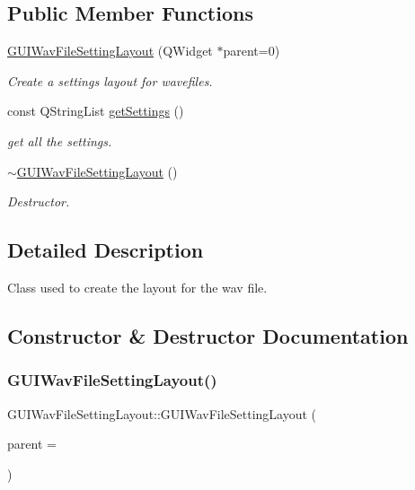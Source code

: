 \subsection*{Public Member Functions}
\begin{DoxyCompactItemize}
\item 
\mbox{\hyperlink{class_g_u_i_wav_file_setting_layout_a7bec868156635dc031d00b88d703941c}{G\+U\+I\+Wav\+File\+Setting\+Layout}} (Q\+Widget $\ast$parent=0)
\begin{DoxyCompactList}\small\item\em Create a settings layout for wavefiles. \end{DoxyCompactList}\item 
const Q\+String\+List \mbox{\hyperlink{class_g_u_i_wav_file_setting_layout_a92e167030a076210126e31c919e7630c}{get\+Settings}} ()
\begin{DoxyCompactList}\small\item\em get all the settings. \end{DoxyCompactList}\item 
\mbox{\hyperlink{class_g_u_i_wav_file_setting_layout_a75965c6246473c055b7ede6e23d94ca4}{$\sim$\+G\+U\+I\+Wav\+File\+Setting\+Layout}} ()
\begin{DoxyCompactList}\small\item\em Destructor. \end{DoxyCompactList}\end{DoxyCompactItemize}


\subsection{Detailed Description}
Class used to create the layout for the wav file. 

\subsection{Constructor \& Destructor Documentation}
\mbox{\label{class_g_u_i_wav_file_setting_layout_a7bec868156635dc031d00b88d703941c}} 
\subsubsection{\texorpdfstring{G\+U\+I\+Wav\+File\+Setting\+Layout()}{GUIWavFileSettingLayout()}}
{\footnotesize\ttfamily G\+U\+I\+Wav\+File\+Setting\+Layout\+::\+G\+U\+I\+Wav\+File\+Setting\+Layout (\begin{DoxyParamCaption}\item[{Q\+Widget $\ast$}]{parent = {} }\end{DoxyParamCaption})}



